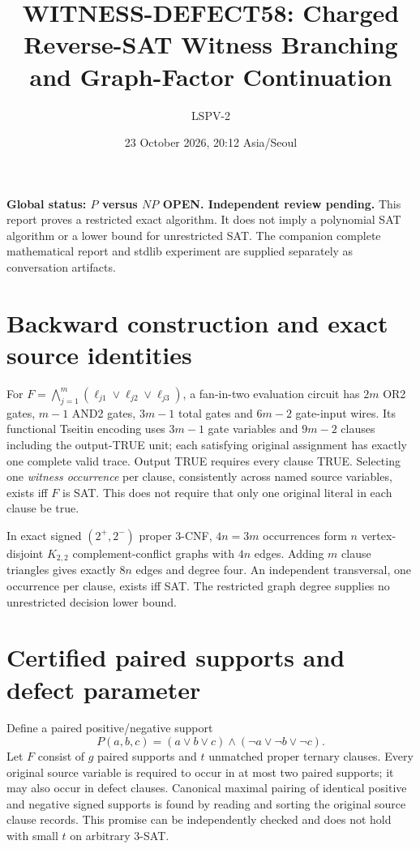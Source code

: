 \documentclass[10pt]{article}
\title{WITNESS-DEFECT58: Charged Reverse-SAT Witness Branching and Graph-Factor Continuation}
\author{LSPV-2}
\date{23 October 2026, 20:12 Asia/Seoul}
\begin{document}
\maketitle
\noindent\textbf{Global status: $P$ versus $NP$ OPEN. Independent review pending.} This report proves a restricted exact algorithm. It does not imply a polynomial SAT algorithm or a lower bound for unrestricted SAT. The companion complete mathematical report and stdlib experiment are supplied separately as conversation artifacts.

\section{Backward construction and exact source identities}
For $F=\bigwedge_{j=1}^m(\ell_{j1}\vee\ell_{j2}\vee\ell_{j3})$, a fan-in-two evaluation circuit has $2m$ OR2 gates, $m-1$ AND2 gates, $3m-1$ total gates and $6m-2$ gate-input wires. Its functional Tseitin encoding uses $3m-1$ gate variables and $9m-2$ clauses including the output-TRUE unit; each satisfying original assignment has exactly one complete valid trace. Output TRUE requires every clause TRUE. Selecting one \emph{witness occurrence} per clause, consistently across named source variables, exists iff $F$ is SAT. This does not require that only one original literal in each clause be true.

In exact signed $(2^+,2^-)$ proper 3-CNF, $4n=3m$ occurrences form $n$ vertex-disjoint $K_{2,2}$ complement-conflict graphs with $4n$ edges. Adding $m$ clause triangles gives exactly $8n$ edges and degree four. An independent transversal, one occurrence per clause, exists iff SAT. The restricted graph degree supplies no unrestricted decision lower bound.

\section{Certified paired supports and defect parameter}
Define a paired positive/negative support
\[
P(a,b,c)=(a\vee b\vee c)\land(\neg a\vee\neg b\vee\neg c).
\]
Let $F$ consist of $g$ paired supports and $t$ unmatched proper ternary clauses. Every original source variable is required to occur in at most two paired supports; it may also occur in defect clauses. Canonical maximal pairing of identical positive and negative signed supports is found by reading and sorting the original source clause records. This promise can be independently checked and does not hold with small $t$ on arbitrary 3-SAT.
\end{document}
